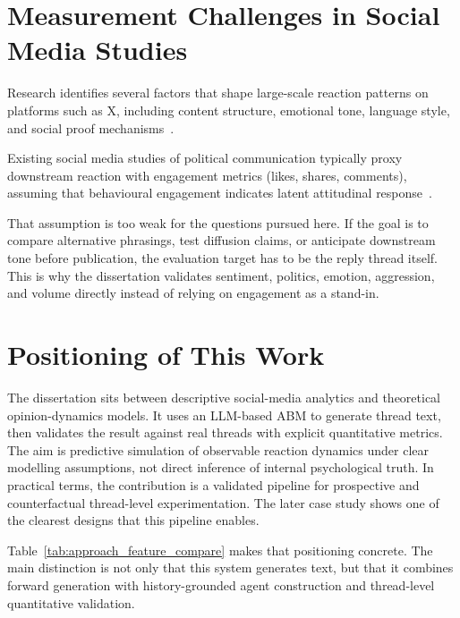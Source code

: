 \documentclass[logo,bsc,singlespacing,parskip,online]{infthesis}
\begin{document}
\section{Measurement Challenges in Social Media Studies}
Research identifies several factors that shape large-scale reaction patterns on platforms such as X, including content structure, emotional tone, language style, and social proof mechanisms~\citep{brady2017emotion,geels2024virtuallabcoats,dumas2022influencers}.

Existing social media studies of political communication typically proxy downstream reaction with engagement metrics (likes, shares, comments), assuming that behavioural engagement indicates latent attitudinal response~\citep{diehl2016political}.

That assumption is too weak for the questions pursued here. If the goal is to compare alternative phrasings, test diffusion claims, or anticipate downstream tone before publication, the evaluation target has to be the reply thread itself. This is why the dissertation validates sentiment, politics, emotion, aggression, and volume directly instead of relying on engagement as a stand-in.

\section{Positioning of This Work}
The dissertation sits between descriptive social-media analytics and theoretical opinion-dynamics models. It uses an LLM-based ABM to generate thread text, then validates the result against real threads with explicit quantitative metrics. The aim is predictive simulation of observable reaction dynamics under clear modelling assumptions, not direct inference of internal psychological truth. In practical terms, the contribution is a validated pipeline for prospective and counterfactual thread-level experimentation. The later case study shows one of the clearest designs that this pipeline enables.

Table~\ref{tab:approach_feature_compare} makes that positioning concrete. The main distinction is not only that this system generates text, but that it combines forward generation with history-grounded agent construction and thread-level quantitative validation.
\end{document}
